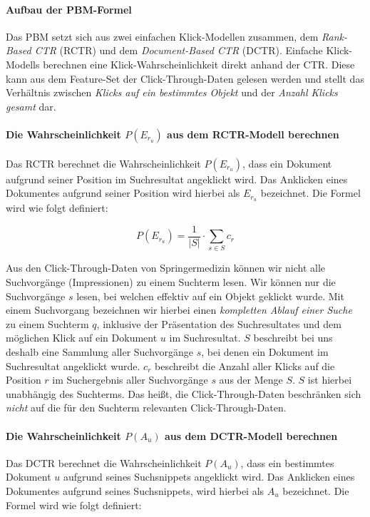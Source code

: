 \paragraph{Aufbau der PBM-Formel}
Das PBM setzt sich aus zwei einfachen Klick-Modellen zusammen, dem \textit{Rank-Based CTR} (RCTR) und dem \textit{Document-Based CTR} (DCTR). Einfache Klick-Modells berechnen eine Klick-Wahrscheinlichkeit direkt anhand der CTR. Diese kann aus dem Feature-Set der Click-Through-Daten gelesen werden und stellt das Verhältnis zwischen \textit{Klicks auf ein bestimmtes Objekt} und der \textit{Anzahl Klicks gesamt} dar. 

\paragraph{Die Wahrscheinlichkeit $P(E_{r_{u}})$ aus dem RCTR-Modell berechnen}
Das RCTR berechnet die Wahrscheinlichkeit $P(E_{r_{u}})$, dass ein Dokument aufgrund seiner Position im Suchresultat angeklickt wird. Das Anklicken eines Dokumentes aufgrund seiner Position wird hierbei als $E_{r_{u}}$ bezeichnet. Die Formel wird wie folgt definiert:

\vspace{-1.5em}
\begin{equation}	
	P(E_{r_{u}}) = \frac{1}{\vert S \vert} \cdot \sum\limits_{s \in S}{c_r}
\end{equation}
\vspace{-1em}

Aus den Click-Through-Daten von Springermedizin können wir nicht alle Suchvorgänge (Impressionen) zu einem Suchterm lesen. Wir können nur die Suchvorgänge $s$ lesen, bei welchen effektiv auf ein Objekt geklickt wurde. Mit einem Suchvorgang bezeichnen wir hierbei einen \textit{kompletten Ablauf einer Suche} zu einem Suchterm $q$, inklusive der Präsentation des Suchresultates und dem möglichen Klick auf ein Dokument $u$ im Suchresultat. $S$ beschreibt bei uns deshalb eine Sammlung aller Suchvorgänge $s$, bei denen ein Dokument im Suchresultat angeklickt wurde. $c_r$ beschreibt die Anzahl aller Klicks auf die Position $r$ im Suchergebnis aller Suchvorgänge $s$ aus der Menge $S$. $S$ ist hierbei unabhängig des Suchterms. Das heißt, die Click-Through-Daten beschränken sich \textit{nicht} auf die für den Suchterm relevanten Click-Through-Daten.  

\paragraph{Die Wahrscheinlichkeit $P(A_{u})$ aus dem DCTR-Modell berechnen}
Das DCTR berechnet die Wahrscheinlichkeit $P(A_{u})$, dass ein bestimmtes Dokument $u$ aufgrund seines Suchsnippets angeklickt wird. Das Anklicken eines Dokumentes aufgrund seines Suchsnippets, wird hierbei als $A_{u}$ bezeichnet. Die Formel wird wie folgt definiert:

